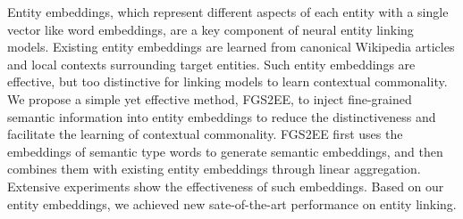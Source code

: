 Entity embeddings, which represent different aspects of each entity with a single vector like word embeddings, are a key component of neural entity linking models. Existing entity embeddings are learned from canonical Wikipedia articles and local contexts surrounding target entities. Such entity embeddings are effective, but too distinctive for linking models to learn contextual commonality. We propose a simple yet effective method, FGS2EE, to inject fine-grained semantic information into entity embeddings to reduce the distinctiveness and facilitate the learning of contextual commonality. FGS2EE first uses the embeddings of semantic type words to generate semantic embeddings, and then combines them with existing entity embeddings through linear aggregation. Extensive experiments show the effectiveness of such embeddings. Based on our entity embeddings, we achieved new sate-of-the-art performance on entity linking.
